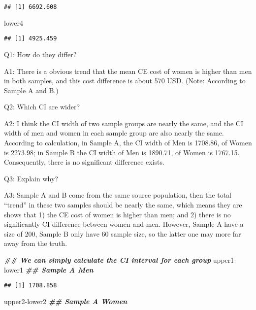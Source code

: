 \documentclass[
]{article}
\newenvironment{Shaded}{\begin{snugshade}}{\end{snugshade}}
\newcommand{\DocumentationTok}[1]{\textcolor[rgb]{0.56,0.35,0.01}{\textbf{\textit{#1}}}}
\newcommand{\NormalTok}[1]{#1}
\newcommand{\SpecialCharTok}[1]{\textcolor[rgb]{0.00,0.00,0.00}{#1}}
\begin{document}
\begin{verbatim}
## [1] 6692.608
\end{verbatim}

\begin{Shaded}
\begin{Highlighting}[]
\NormalTok{lower4}
\end{Highlighting}
\end{Shaded}

\begin{verbatim}
## [1] 4925.459
\end{verbatim}

Q1: How do they differ?

A1: There is a obvious trend that the mean CE cost of women is higher
than men in both samples, and this cost difference is about 570 USD.
(Note: According to Sample A and B.)

Q2: Which CI are wider?

A2: I think the CI width of two sample groups are nearly the same, and
the CI width of men and women in each sample group are also nearly the
same. According to calculation, in Sample A, the CI width of Men is
1708.86, of Women is 2273.98; in Sample B the CI width of Men is
1890.71, of Women is 1767.15. Consequently, there is no significant
difference exists.

Q3: Explain why?

A3: Sample A and B come from the same source population, then the total
``trend'' in these two samples should be nearly the same, which means
they are shows that 1) the CE cost of women is higher than men; and 2)
there is no significantly CI difference between women and men. However,
Sample A have a size of 200, Sample B only have 60 sample size, so the
latter one may more far away from the truth.

\begin{Shaded}
\begin{Highlighting}[]
\DocumentationTok{\#\# We can simply calculate the CI interval for each group}
\NormalTok{upper1}\SpecialCharTok{{-}}\NormalTok{lower1 }\DocumentationTok{\#\# Sample A Men}
\end{Highlighting}
\end{Shaded}

\begin{verbatim}
## [1] 1708.858
\end{verbatim}

\begin{Shaded}
\begin{Highlighting}[]
\NormalTok{upper2}\SpecialCharTok{{-}}\NormalTok{lower2 }\DocumentationTok{\#\# Sample A Women}
\end{Highlighting}
\end{Shaded}
\end{document}
